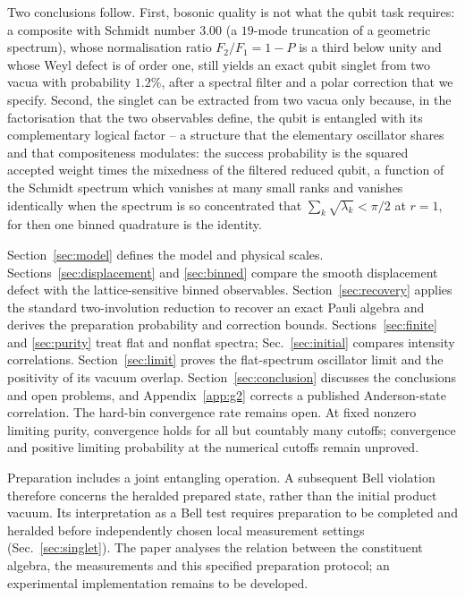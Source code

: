 \documentclass[11pt,a4paper]{article}
\begin{document}
Two conclusions follow. First, bosonic quality is not what the qubit task requires: a composite with Schmidt number $3.00$ (a $19$-mode truncation of a geometric spectrum), whose normalisation ratio $F_2/F_1=1-P$ is a third below unity and whose Weyl defect is of order one, still yields an exact qubit singlet from two vacua with probability $1.2\%$, after a spectral filter and a polar correction that we specify. Second, the singlet can be extracted from two vacua only because, in the factorisation that the two observables define, the qubit is entangled with its complementary logical factor -- a structure that the elementary oscillator shares and that compositeness modulates: the success probability is the squared accepted weight times the mixedness of the filtered reduced qubit, a function of the Schmidt spectrum which vanishes at many small ranks and vanishes identically when the spectrum is so concentrated that $\sum_k\sqrt{\lambda_k}<\pi/2$ at $r=1$, for then one binned quadrature is the identity.

Section~\ref{sec:model} defines the model and physical scales. Sections~\ref{sec:displacement} and \ref{sec:binned} compare the smooth displacement defect with the lattice-sensitive binned observables. Section~\ref{sec:recovery} applies the standard two-involution reduction \cite{Masanes2005,Kaniewski2016} to recover an exact Pauli algebra and derives the preparation probability and correction bounds. Sections~\ref{sec:finite} and \ref{sec:purity} treat flat and nonflat spectra; Sec.~\ref{sec:initial} compares intensity correlations. Section~\ref{sec:limit} proves the flat-spectrum oscillator limit and the positivity of its vacuum overlap. Section~\ref{sec:conclusion} discusses the conclusions and open problems, and Appendix~\ref{app:g2} corrects a published Anderson-state correlation. The hard-bin convergence rate remains open. At fixed nonzero limiting purity, convergence holds for all but countably many cutoffs; convergence and positive limiting probability at the numerical cutoffs remain unproved.

Preparation includes a joint entangling operation. A subsequent Bell violation therefore concerns the heralded prepared state, rather than the initial product vacuum. Its interpretation as a Bell test requires preparation to be completed and heralded before independently chosen local measurement settings (Sec.~\ref{sec:singlet}). The paper analyses the relation between the constituent algebra, the measurements and this specified preparation protocol; an experimental implementation remains to be developed.
\end{document}
